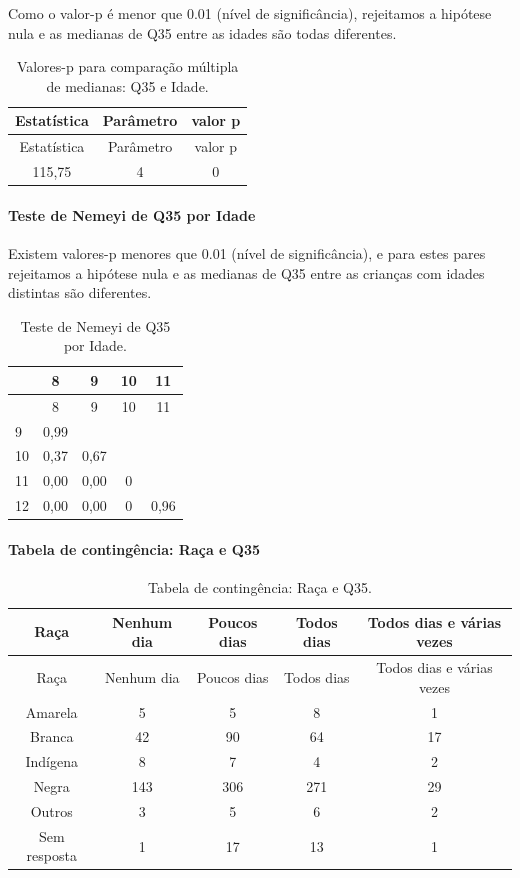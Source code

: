 \documentclass[]{article}
\let\oldparagraph\paragraph
\renewcommand{\paragraph}[1]{\oldparagraph{#1}\mbox{}}
\begin{document}
Como o valor-p é menor que 0.01 (nível de significância), rejeitamos a hipótese nula e as medianas de Q35 entre as idades são todas diferentes.

\begin{longtable}[]{@{}ccc@{}}
\caption{\label{tab:unnamed-chunk-1279}Valores-p para comparação múltipla de medianas: Q35 e Idade.}\tabularnewline
\toprule
Estatística & Parâmetro & valor p\tabularnewline
\midrule
\endfirsthead
\toprule
Estatística & Parâmetro & valor p\tabularnewline
\midrule
\endhead
115,75 & 4 & 0\tabularnewline
\bottomrule
\end{longtable}

\hypertarget{teste-de-nemeyi-de-q35-por-idade}{%
\paragraph{Teste de Nemeyi de Q35 por Idade}\label{teste-de-nemeyi-de-q35-por-idade}}

Existem valores-p menores que 0.01 (nível de significância), e para estes pares rejeitamos a hipótese nula e as medianas de Q35 entre as crianças com idades distintas são diferentes.

\begin{longtable}[]{@{}lcccc@{}}
\caption{\label{tab:unnamed-chunk-1281}Teste de Nemeyi de Q35 por Idade.}\tabularnewline
\toprule
& 8 & 9 & 10 & 11\tabularnewline
\midrule
\endfirsthead
\toprule
& 8 & 9 & 10 & 11\tabularnewline
\midrule
\endhead
9 & 0,99 & & &\tabularnewline
10 & 0,37 & 0,67 & &\tabularnewline
11 & 0,00 & 0,00 & 0 &\tabularnewline
12 & 0,00 & 0,00 & 0 & 0,96\tabularnewline
\bottomrule
\end{longtable}

\cleardoublepage

\hypertarget{tabela-de-continguxeancia-rauxe7a-e-q35}{%
\paragraph{Tabela de contingência: Raça e Q35}\label{tabela-de-continguxeancia-rauxe7a-e-q35}}

\begin{longtable}[]{@{}ccccc@{}}
\caption{\label{tab:unnamed-chunk-1282}Tabela de contingência: Raça e Q35.}\tabularnewline
\toprule
Raça & Nenhum dia & Poucos dias & Todos dias & Todos dias e várias vezes\tabularnewline
\midrule
\endfirsthead
\toprule
Raça & Nenhum dia & Poucos dias & Todos dias & Todos dias e várias vezes\tabularnewline
\midrule
\endhead
Amarela & 5 & 5 & 8 & 1\tabularnewline
Branca & 42 & 90 & 64 & 17\tabularnewline
Indígena & 8 & 7 & 4 & 2\tabularnewline
Negra & 143 & 306 & 271 & 29\tabularnewline
Outros & 3 & 5 & 6 & 2\tabularnewline
Sem resposta & 1 & 17 & 13 & 1\tabularnewline
\bottomrule
\end{longtable}
\end{document}

